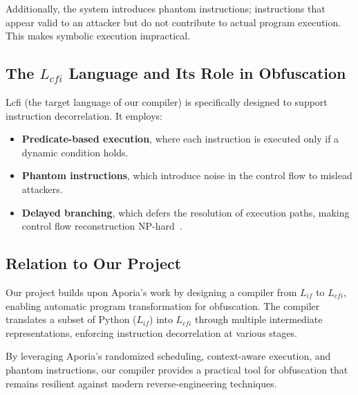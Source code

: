 Additionally, the system introduces phantom instructions; instructions that appear valid to an attacker but do not contribute to actual program execution. This makes symbolic execution impractical.

\subsection{The $L_{cfi}$ Language and Its Role in Obfuscation}
Lcfi (the target language of our compiler) is specifically designed to support instruction decorrelation. It employs:
\begin{itemize}
    \item \textbf{Predicate-based execution}, where each instruction is executed only if a dynamic condition holds.
    \item \textbf{Phantom instructions}, which introduce noise in the control flow to mislead attackers.
    \item \textbf{Delayed branching}, which defers the resolution of execution paths, making control flow reconstruction NP-hard~\cite{ajorian2024aporia}.
\end{itemize}

\subsection{Relation to Our Project}
Our project builds upon Aporia’s work by designing a compiler from $L_{if}$ to $L_{cfi}$, enabling automatic program transformation for obfuscation. The compiler translates a subset of Python ($L_{if}$) into $L_{cfi}$ through multiple intermediate representations, enforcing instruction decorrelation at various stages.

By leveraging Aporia’s randomized scheduling, context-aware execution, and phantom instructions, our compiler provides a practical tool for obfuscation that remains resilient against modern reverse-engineering techniques.


